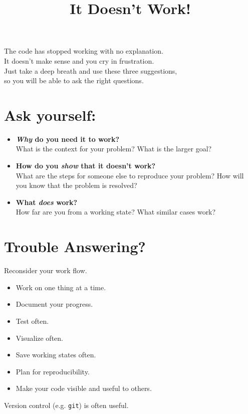 \documentclass{article}
\title{It Doesn't Work!}
\date{}
\author{}
\begin{document}
\maketitle
\vspace{-40pt}

\begin{center}
The code has stopped working with no explanation. \\
It doesn't make sense and you cry in frustration.\\
Just take a deep breath and use these three suggestions, \\
so you will be able to ask the right questions.\\
\end{center}

\section*{Ask yourself:}
\begin{itemize}
\item \textbf{\emph{Why} do you need it to work?}\\
What is the context for your problem? What is the larger goal?

\item \textbf{How do you \emph{show} that it doesn't work?}\\
What are the steps for someone else to reproduce your problem?
How will you know that the problem is resolved?

\item \textbf{What \emph{does} work?}\\
How far are you from a working state? What similar cases work?
\end{itemize}

\vspace{10pt}

\section*{Trouble Answering?}
Reconsider your work flow. 
\begin{itemize}
\item Work on one thing at a time. 
\item Document your progress. 
\item Test often. 
\item Visualize often. 
\item Save working states often. 
\item Plan for reproducibility. 
\item Make your code visible and useful to others. 
\end{itemize}
Version control (e.g. \texttt{git}) is often useful.
\end{document}
